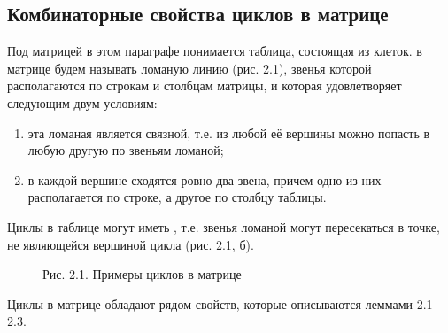 \subsection{Комбинаторные свойства циклов в матрице}
Под матрицей в этом параграфе понимается таблица, состоящая из клеток. {} в матрице будем называть ломаную линию (рис. 2.1), звенья которой располагаются по строкам и столбцам матрицы, и которая удовлетворяет следующим двум условиям: %

\begin{enumerate}
\renewcommand{\labelenumi}{\theenumi)}
\item эта ломаная является связной, т.е. из любой её вершины можно попасть в любую другую по звеньям ломаной;
\item в каждой вершине сходятся ровно два звена, причем одно из них располагается по строке, а другое по столбцу таблицы.
\end{enumerate}

Циклы в таблице могут иметь {}, т.е. звенья ломаной могут пересекаться в точке, не являющейся вершиной цикла (рис. 2.1, б). %

\begin{figure}[h]
\caption*{Рис. 2.1. Примеры циклов в матрице}
\label{picture_2_1}
\end{figure}

Циклы в матрице обладают рядом свойств, которые описываются леммами 2.1 - 2.3. %



